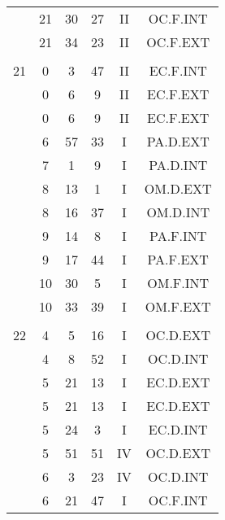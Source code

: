 \documentclass[12pt, a4paper]{article}
\begin{document}
\begin{multicols}{3}
{\begin{tabular}{c c c c c c}
	 	 	 	 & 21 & 30 & 27 & II & OC.F.INT\\%
	 	 	 	 & 21 & 34 & 23 & II & OC.F.EXT\\%
	 	 	 	 & & & & & \\%
	 	 	 	21 & 0 & 3 & 47 & II & EC.F.INT\\%
	 	 	 	 & 0 & 6 & 9 & II & EC.F.EXT\\%
	 	 	 	 & 0 & 6 & 9 & II & EC.F.EXT\\%
	 	 	 	 & 6 & 57 & 33 & I & PA.D.EXT\\%
	 	 	 	 & 7 & 1 & 9 & I & PA.D.INT\\%
	 	 	 	 & 8 & 13 & 1 & I & OM.D.EXT\\%
	 	 	 	 & 8 & 16 & 37 & I & OM.D.INT\\%
	 	 	 	 & 9 & 14 & 8 & I & PA.F.INT\\%
	 	 	 	 & 9 & 17 & 44 & I & PA.F.EXT\\%
	 	 	 	 & 10 & 30 & 5 & I & OM.F.INT\\%
	 	 	 	 & 10 & 33 & 39 & I & OM.F.EXT\\%
	 	 	 	 & & & & & \\%
	 	 	 	22 & 4 & 5 & 16 & I & OC.D.EXT\\%
	 	 	 	 & 4 & 8 & 52 & I & OC.D.INT\\%
	 	 	 	 & 5 & 21 & 13 & I & EC.D.EXT\\%
	 	 	 	 & 5 & 21 & 13 & I & EC.D.EXT\\%
	 	 	 	 & 5 & 24 & 3 & I & EC.D.INT\\%
	 	 	 	 & 5 & 51 & 51 & IV & OC.D.EXT\\%
	 	 	 	 & 6 & 3 & 23 & IV & OC.D.INT\\%
	 	 	 	 & 6 & 21 & 47 & I & OC.F.INT\\%

\end{tabular}}
\end{multicols}
\end{document}
